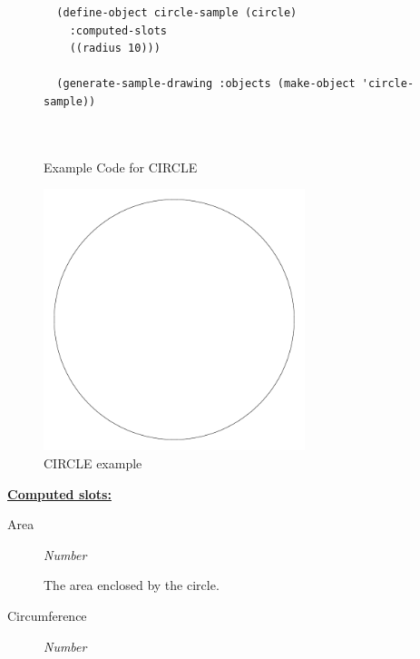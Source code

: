 \documentclass [11pt]{book}
\begin{document}
\begin{itemize}
\begin{figure}
\begin{lrbox}{\boxedverb}
\begin{minipage}{\linewidth}
{\begin{verbatim}
  (define-object circle-sample (circle)
    :computed-slots
    ((radius 10)))

  (generate-sample-drawing :objects (make-object 'circle-sample))

                  

\end{verbatim}}
\end{minipage}
\end{lrbox}
\fbox{\usebox{\boxedverb}}

\caption{Example Code for CIRCLE}

\label{fig:example-code-CIRCLE}

\end{figure}

\begin{figure}
\begin{center}
\includegraphics[width=3in,height=3in]{../images/example-circle.pdf}
\end{center}

\caption{CIRCLE example}

\label{fig:CIRCLE}

\end{figure}





\textbf{
\underline{Computed slots:}}

\begin{description}

\item [Area]
\emph{Number}

 The area enclosed by the circle.




\item [Circumference]
\emph{Number}


\end{description}
\end{itemize}
\end{document}

